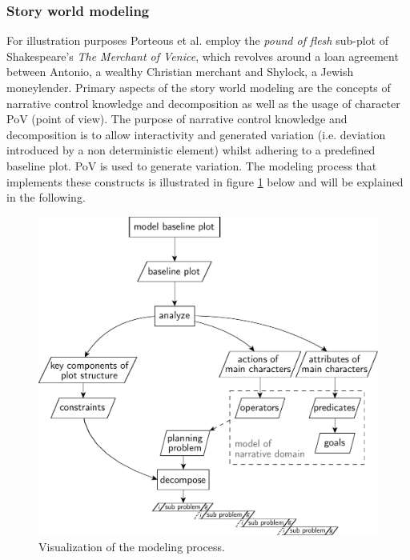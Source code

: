 \subsubsection{Story world modeling}
For illustration purposes Porteous et al. \cite{Porteous10} employ the \emph{pound of flesh} sub-plot of Shakespeare's \emph{The Merchant of Venice}, which revolves around a loan agreement between Antonio, a wealthy Christian merchant and Shylock, a Jewish moneylender. Primary aspects of the story world modeling are the concepts of narrative control knowledge and decomposition as well as the usage of character PoV (point of view). The purpose of narrative control knowledge and decomposition is to allow interactivity and generated variation (i.e. deviation introduced by a non deterministic element) whilst adhering to a predefined baseline plot. PoV is used to generate variation. The modeling process that implements these constructs is illustrated in figure \ref{fig:modproc} below and will be explained in the following.%
\begin{figure}[hhhh]
 \centering
 \includegraphics[scale=0.6]{discourse_model}
 \caption{Visualization of the modeling process.}
 \label{fig:modproc}
\end{figure}


